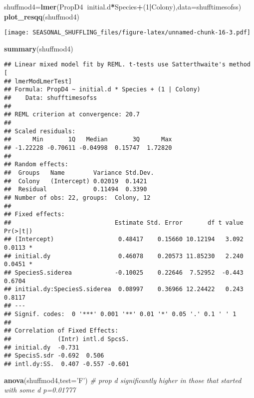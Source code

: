\documentclass[]{article}
\newenvironment{Shaded}{\begin{snugshade}}{\end{snugshade}}
\newcommand{\CommentTok}[1]{\textcolor[rgb]{0.56,0.35,0.01}{\textit{#1}}}
\newcommand{\DataTypeTok}[1]{\textcolor[rgb]{0.13,0.29,0.53}{#1}}
\newcommand{\DecValTok}[1]{\textcolor[rgb]{0.00,0.00,0.81}{#1}}
\newcommand{\KeywordTok}[1]{\textcolor[rgb]{0.13,0.29,0.53}{\textbf{#1}}}
\newcommand{\NormalTok}[1]{#1}
\newcommand{\OperatorTok}[1]{\textcolor[rgb]{0.81,0.36,0.00}{\textbf{#1}}}
\newcommand{\StringTok}[1]{\textcolor[rgb]{0.31,0.60,0.02}{#1}}
\begin{document}
\begin{Shaded}
\begin{Highlighting}[]
\NormalTok{shuffmod4=}\KeywordTok{lmer}\NormalTok{(PropD4}\OperatorTok{~}\NormalTok{initial.d}\OperatorTok{*}\NormalTok{Species}\OperatorTok{+}\NormalTok{(}\DecValTok{1}\OperatorTok{|}\NormalTok{Colony),}\DataTypeTok{data=}\NormalTok{shufftimesofss)}
\KeywordTok{plot_resqq}\NormalTok{(shuffmod4)}
\end{Highlighting}
\end{Shaded}

\texttt{[image: SEASONAL\_SHUFFLING\_files/figure-latex/unnamed-chunk-16-3.pdf]}

\begin{Shaded}
\begin{Highlighting}[]
\KeywordTok{summary}\NormalTok{(shuffmod4)}
\end{Highlighting}
\end{Shaded}

\begin{verbatim}
## Linear mixed model fit by REML. t-tests use Satterthwaite's method [
## lmerModLmerTest]
## Formula: PropD4 ~ initial.d * Species + (1 | Colony)
##    Data: shufftimesofss
## 
## REML criterion at convergence: 20.7
## 
## Scaled residuals: 
##      Min       1Q   Median       3Q      Max 
## -1.22228 -0.70611 -0.04998  0.15747  1.72820 
## 
## Random effects:
##  Groups   Name        Variance Std.Dev.
##  Colony   (Intercept) 0.02019  0.1421  
##  Residual             0.11494  0.3390  
## Number of obs: 22, groups:  Colony, 12
## 
## Fixed effects:
##                             Estimate Std. Error       df t value Pr(>|t|)  
## (Intercept)                  0.48417    0.15660 10.12194   3.092   0.0113 *
## initial.dy                   0.46078    0.20573 11.85230   2.240   0.0451 *
## SpeciesS.siderea            -0.10025    0.22646  7.52952  -0.443   0.6704  
## initial.dy:SpeciesS.siderea  0.08997    0.36966 12.24422   0.243   0.8117  
## ---
## Signif. codes:  0 '***' 0.001 '**' 0.01 '*' 0.05 '.' 0.1 ' ' 1
## 
## Correlation of Fixed Effects:
##             (Intr) intl.d SpcsS.
## initial.dy  -0.731              
## SpecisS.sdr -0.692  0.506       
## intl.dy:SS.  0.407 -0.557 -0.601
\end{verbatim}

\begin{Shaded}
\begin{Highlighting}[]
\KeywordTok{anova}\NormalTok{(shuffmod4,}\DataTypeTok{test=}\StringTok{'F'}\NormalTok{) }\CommentTok{# prop d significantly higher in those that started with some d p=0.01777}
\end{Highlighting}
\end{Shaded}
\end{document}
